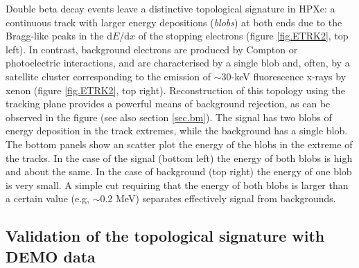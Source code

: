 Double beta decay events leave a distinctive topological signature in HPXe: a continuous track with larger energy depositions (\emph{blobs}) at both ends due to the Bragg-like peaks in the 
d$E$/d$x$ of the stopping electrons (figure \ref{fig.ETRK2}, top left). In contrast, background electrons are produced by Compton or photoelectric interactions, and are characterised by a single blob and, often, by a satellite cluster corresponding to the emission of $\sim30$-keV fluorescence x-rays by xenon (figure \ref{fig.ETRK2}, top right).
Reconstruction of this topology using the tracking plane provides a powerful means of background rejection, as can be observed in the figure (see also section \ref{sec.bm}). The signal has two blobs of energy deposition in the track extremes, while the background has a single blob. The bottom panels show an scatter plot the energy of the blobs in the extreme of the tracks. In the case of the signal (bottom left) the energy of both blobs is high and about the same. In the case of background (top right) the energy of one blob is very small.  A simple cut requiring that the energy of both blobs is larger than a certain value (e.g, $\sim$0.2 MeV) separates effectively signal from backgrounds.

\subsection{Validation of the topological signature with DEMO data}

